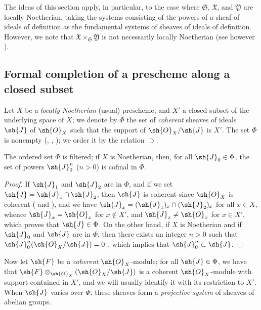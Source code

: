\begin{env}[10.7.4]
The ideas of this section apply, in particular, to the case where $\mathfrak{S}$, $\mathfrak{X}$, and $\mathfrak{Y}$ are locally Noetherian, taking the systems consisting of the powers of a sheaf of ideals of definition  as the fundamental systems of sheaves of ideals of definition.
However, we note that $\mathfrak{X}\times_\mathfrak{S}\mathfrak{Y}$ is not necessarily locally Noetherian (see however ).
\end{env}

\subsection{Formal completion of a prescheme along a closed subset}
\label{subsection:I.10.8}

\begin{env}[10.8.1]
\label{I.10.8.1}
Let $X$ be a \emph{locally Noetherian} (usual) prescheme, and $X'$ a closed subset of the underlying space of $X$; we denote by $\Phi$ the set of \emph{coherent} sheaves of ideals $\sh{J}$ of $\sh{O}_X$ such that the support of $\sh{O}_X/\sh{J}$ is $X'$.
The set $\Phi$ is nonempty (, , ); we order it by the relation $\supset$.
\end{env}

\begin{lemma}[10.8.2]
\label{I.10.8.2}
The ordered set $\Phi$ is filtered; if $X$ is Noetherian, then, for all $\sh{J}_0\in\Phi$, the set of powers $\sh{J}_0^n$ ($n>0$) is cofinal in $\Phi$.
\end{lemma}

\begin{proof}
If $\sh{J}_1$ and $\sh{J}_2$ are in $\Phi$, and if we set $\sh{J}=\sh{J}_1\cap\sh{J}_2$, then $\sh{J}$ is coherent since $\sh{O}_X$ is coherent ( and ), and we have $\sh{J}_x=(\sh{J}_1)_x\cap(\sh{J}_2)_x$ for all $x\in X$, whence $\sh{J}_x=\sh{O}_x$ for $x\not\in X'$, and $\sh{J}_x\neq\sh{O}_x$ for $x\in X'$, which proves that $\sh{J}\in\Phi$.
On the other hand, if $X$ is Noetherian and if $\sh{J}_0$ and $\sh{J}$ are in $\Phi$, then there exists an integer $n>0$ such that $\sh{J}_0^n(\sh{O}_X/\sh{J})=0$ , which implies that $\sh{J}_0^n\subset\sh{J}$.
\end{proof}

\begin{env}[10.8.3]
\label{I.10.8.3}
Now let $\sh{F}$ be a \emph{coherent} $\sh{O}_X$-module; for all $\sh{J}\in\Phi$, we have that $\sh{F}\otimes_{\sh{O}_X}(\sh{O}_X/\sh{J})$ is a coherent $\sh{O}_X$-module  with support contained in $X'$, and we will usually identify it with its restriction to $X'$.
When $\sh{J}$ varies over $\Phi$, these sheaves form a \emph{projective system} of sheaves of abelian groups.
\end{env}

